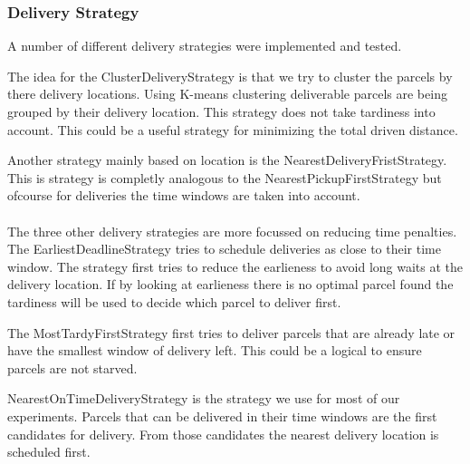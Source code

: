 \documentclass[../main.tex]{subfiles}
\begin{document}
\subsubsection{Delivery Strategy}
A number of different delivery strategies were implemented and tested. 

The idea for the ClusterDeliveryStrategy is that we try to cluster the parcels by there delivery locations. 
Using K-means clustering deliverable parcels are being grouped by their delivery location.
This strategy does not take tardiness into account.
This could be a useful strategy for minimizing the total driven distance. 

Another strategy mainly based on location is the NearestDeliveryFristStrategy.
This is strategy is completly analogous to the NearestPickupFirstStrategy but ofcourse for deliveries the time windows are taken into account.
\\\\
The three other delivery strategies are more focussed on reducing time penalties.
The EarliestDeadlineStrategy tries to schedule deliveries as close to their time window.
The strategy first tries to reduce the earlieness to avoid long waits at the delivery location.
If by looking at earlieness there is no optimal parcel found the tardiness will be used to decide which parcel to deliver first. 

The MostTardyFirstStrategy first tries to deliver parcels that are already late or have the smallest window of delivery left. 
This could be a logical to ensure parcels are not starved.

NearestOnTimeDeliveryStrategy is the strategy we use for most of our experiments. 
Parcels that can be delivered in their time windows are the first candidates for delivery.
From those candidates the nearest delivery location is scheduled first.
\end{document}
